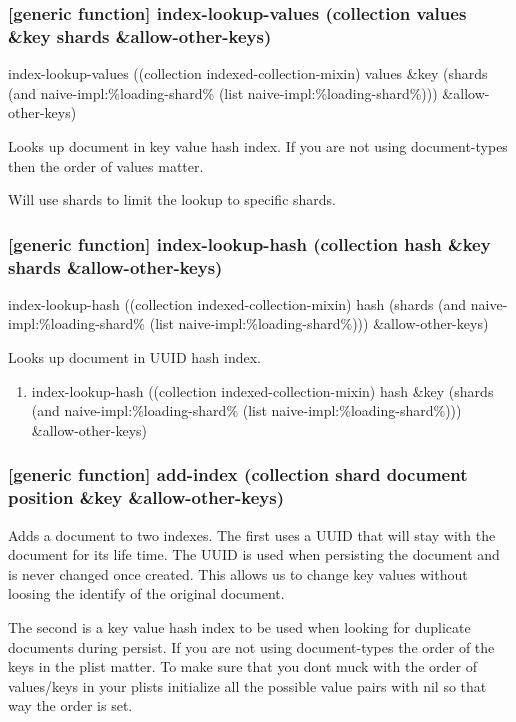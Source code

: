 \documentclass[11pt]{article}
\begin{document}
\subsubsection{[generic function] index-lookup-values  (collection values \&key shards \&allow-other-keys)}
\label{sec:org8cdb927}

index-lookup-values ((collection indexed-collection-mixin) values
\&key (shards (and naive-impl:\%loading-shard\% (list naive-impl:\%loading-shard\%)))
\&allow-other-keys)

Looks up document in key value hash index. If you are not using
document-types then the order of values matter.

Will use shards to limit the lookup to specific shards.

\subsubsection{[generic function] index-lookup-hash (collection hash \&key shards \&allow-other-keys)}
\label{sec:org7021e92}

index-lookup-hash ((collection indexed-collection-mixin) hash
(shards (and naive-impl:\%loading-shard\%	(list naive-impl:\%loading-shard\%)))
\&allow-other-keys)

Looks up document in UUID hash index.

\begin{enumerate}
\item index-lookup-hash ((collection indexed-collection-mixin) hash \&key (shards (and naive-impl:\%loading-shard\% (list naive-impl:\%loading-shard\%))) \&allow-other-keys)
\label{sec:org7d48180}
\end{enumerate}

\subsubsection{[generic function] add-index (collection shard document position \&key \&allow-other-keys)}
\label{sec:orgbd652dc}

Adds a document to two indexes. The first uses a UUID that will stay
with the document for its life time. The UUID is used when persisting
the document and is never changed once created. This allows us to
change key values without loosing the identify of the original
document.

The second is a key value hash index to be used when looking for
duplicate documents during persist. If you are not using
document-types the order of the keys in the plist matter. To make sure
that you dont muck with the order of values/keys in your plists
initialize all the possible value pairs with nil so that way the order
is set.
\end{document}
